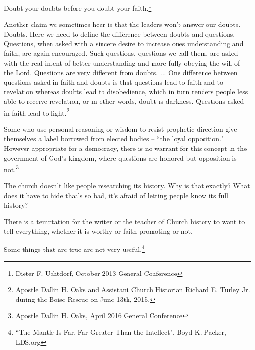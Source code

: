 \begin{displayquote}
Doubt your doubts before you doubt your faith.\footnote{Dieter F. Uchtdorf, 
October 2013 General Conference}
\end{displayquote}

\begin{displayquote}
Another claim we sometimes hear is that the leaders won't answer our doubts. Doubts.
Here we need to define the difference between doubts and questions. Questions, when
asked with a sincere desire to increase ones understanding and faith, are again
encouraged. Such questions, questions we call them, are asked with the real intent of
better understanding and more fully obeying the will of the Lord. Questions are very
different from doubts. ... One difference between questions asked in faith and doubts
is that questions lead to faith and to revelation whereas doubts lead to
disobedience, which in turn renders people less able to receive revelation, or in
other words, doubt is darkness. Questions asked in faith lead to light.\footnote{
Apostle Dallin H. Oaks and Assistant Church Historian Richard E. Turley Jr. 
during the Boise Rescue on June 13th, 2015.
}
\end{displayquote}

\begin{displayquote}
Some who use personal reasoning or wisdom to resist prophetic direction give
themselves a label borrowed from elected bodies -- ``the loyal opposition." However
appropriate for a democracy, there is no warrant for this concept in the government
of God's kingdom, where questions are honored but opposition is not.\footnote{
Apostle Dallin H. Oaks, April 2016 General Conference
}
\end{displayquote}

The church doesn't like people researching its history. Why is that exactly? What
does it have to hide that's so bad, it's afraid of letting people know its full
history?

\begin{displayquote}
There is a temptation for the writer or the teacher of Church history to want to tell 
everything, whether it is worthy or faith promoting or not.

Some things that are true are not very useful.\footnote{``The Mantle Is Far, Far 
Greater Than the Intellect", Boyd K. Packer, LDS.org}
\end{displayquote}